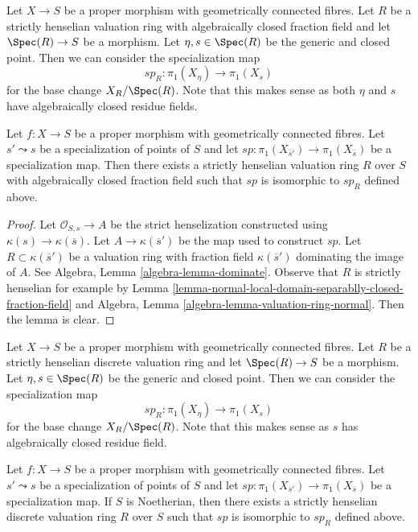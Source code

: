 \noindent
Let $X \to S$ be a proper morphism with geometrically connected fibres.
Let $R$ be a strictly henselian valuation ring with algebraically
closed fraction field and let $\Spec(R) \to S$
be a morphism. Let $\eta, s \in \Spec(R)$ be the generic and closed point.
Then we can consider the specialization map
$$
sp_R : \pi_1(X_\eta) \to \pi_1(X_s)
$$
for the base change $X_R/\Spec(R)$. Note that this makes sense as both
$\eta$ and $s$ have algebraically closed residue fields.

\begin{lemma}
\label{lemma-specialization-map-valuation-ring}
Let $f : X \to S$ be a proper morphism with geometrically connected fibres.
Let $s' \leadsto s$ be a specialization of points of $S$ and let
$sp : \pi_1(X_{\overline{s}'}) \to \pi_1(X_{\overline{s}})$
be a specialization map. Then there exists a strictly henselian
valuation ring $R$ over $S$ with algebraically closed fraction field
such that $sp$ is isomorphic to $sp_R$ defined above.
\end{lemma}

\begin{proof}
Let $\mathcal{O}_{S, s} \to A$ be the strict henselization
constructed using $\kappa(s) \to \kappa(\overline{s})$.
Let $A \to \kappa(\overline{s}')$ be the map used to construct $sp$.
Let $R \subset \kappa(\overline{s}')$ be a valuation ring with
fraction field $\kappa(\overline{s}')$ dominating the image of $A$.
See Algebra, Lemma \ref{algebra-lemma-dominate}.
Observe that $R$ is strictly henselian for example by
Lemma \ref{lemma-normal-local-domain-separablly-closed-fraction-field}
and Algebra, Lemma \ref{algebra-lemma-valuation-ring-normal}.
Then the lemma is clear.
\end{proof}

\noindent
Let $X \to S$ be a proper morphism with geometrically connected fibres.
Let $R$ be a strictly henselian discrete valuation ring and let
$\Spec(R) \to S$ be a morphism. Let $\eta, s \in \Spec(R)$ be the
generic and closed point. Then we can consider the specialization map
$$
sp_R : \pi_1(X_{\overline{\eta}}) \to \pi_1(X_s)
$$
for the base change $X_R/\Spec(R)$. Note that this makes sense as $s$
has algebraically closed residue field.

\begin{lemma}
\label{lemma-specialization-map-discrete-valuation-ring}
Let $f : X \to S$ be a proper morphism with geometrically connected fibres.
Let $s' \leadsto s$ be a specialization of points of $S$ and let
$sp : \pi_1(X_{\overline{s}'}) \to \pi_1(X_{\overline{s}})$
be a specialization map. If $S$ is Noetherian, then
there exists a strictly henselian
discrete valuation ring $R$ over $S$ such that $sp$ is isomorphic to $sp_R$
defined above.
\end{lemma}

